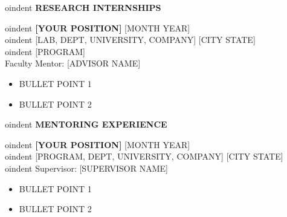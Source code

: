 \documentclass[12pt]{article}
\begin{document}

\begin{center}
	{
oindent \bfseries RESEARCH INTERNSHIPS}
\end{center} 

\vspace{8pt} %


oindent
{\bfseries [YOUR POSITION]} \hfill [MONTH YEAR] \\ 

oindent [LAB, DEPT, UNIVERSITY, COMPANY] \hfill [CITY STATE] \\ 

oindent [PROGRAM] \\  
Faculty Mentor: [ADVISOR NAME]

\vspace{6pt}
\begin{itemize} \itemsep -2pt %
	\item BULLET POINT 1
	\item BULLET POINT 2
\end{itemize}


\vspace{0.2in} %


\begin{center}
	{
oindent \bfseries MENTORING EXPERIENCE}
\end{center}

\vspace{8pt} %


oindent
{\bfseries [YOUR POSITION]} \hfill [MONTH YEAR] \\ 

oindent [PROGRAM, DEPT, UNIVERSITY, COMPANY] \hfill [CITY STATE] \\ 

oindent Supervisor: [SUPERVISOR NAME]

\vspace{6pt}
\begin{itemize} \itemsep -2pt %
	\item BULLET POINT 1
	\item BULLET POINT 2
\end{itemize}

\vspace{0.2in} %
\end{document}
